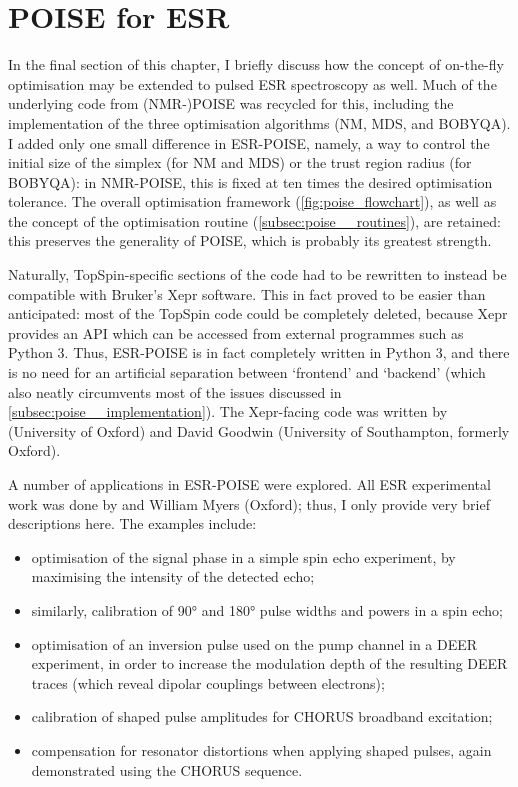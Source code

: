\section{POISE for ESR}
\label{sec:poise__esrpoise}

In the final section of this chapter, I briefly discuss how the concept of on-the-fly optimisation may be extended to pulsed ESR spectroscopy as well.
Much of the underlying code from (NMR-)POISE was recycled for this, including the implementation of the three optimisation algorithms (NM, MDS, and BOBYQA).
I added only one small difference in ESR-POISE, namely, a way to control the initial size of the simplex (for NM and MDS) or the trust region radius (for BOBYQA): in NMR-POISE, this is fixed at ten times the desired optimisation tolerance.
The overall optimisation framework (\cref{fig:poise_flowchart}), as well as the concept of the optimisation routine (\cref{subsec:poise__routines}), are retained: this preserves the generality of POISE, which is probably its greatest strength.

Naturally, TopSpin-specific sections of the code had to be rewritten to instead be compatible with Bruker's Xepr software.
This in fact proved to be easier than anticipated: most of the TopSpin code could be completely deleted, because Xepr provides an API which can be accessed from external programmes such as Python 3.
Thus, ESR-POISE is in fact completely written in Python 3, and there is no need for an artificial separation between `frontend' and `backend' (which also neatly circumvents most of the issues discussed in \cref{subsec:poise__implementation}).
The Xepr-facing code was written by \JBV{} (University of Oxford) and David Goodwin (University of Southampton, formerly Oxford).

A number of applications in ESR-POISE were explored.
All ESR experimental work was done by \JBV{} and William Myers (Oxford); thus, I only provide very brief descriptions here.
The examples include:

\begin{itemize}
    \item optimisation of the signal phase in a simple spin echo experiment, by maximising the intensity of the detected echo;
    \item similarly, calibration of \ang{90} and \ang{180} pulse widths and powers in a spin echo;
    \item optimisation of an inversion pulse used on the pump channel in a DEER experiment\autocite{Pannier2000JMR}, in order to increase the modulation depth of the resulting DEER traces (which reveal dipolar couplings between electrons);
    \item calibration of shaped pulse amplitudes for CHORUS broadband excitation\autocite{Foroozandeh2019JMR,Verstraete2021JCP};
    \item compensation for resonator distortions when applying shaped pulses, again demonstrated using the CHORUS sequence.
\end{itemize}

